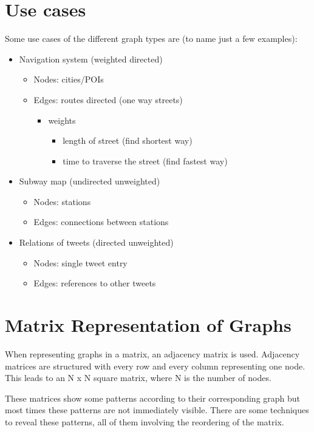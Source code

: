 \section{Use cases}
Some use cases of the different graph types are (to name just a few examples):
\begin{itemize}
\item Navigation system (weighted directed)
	\begin{itemize}
		\item Nodes: cities/POIs
		\item Edges: routes directed (one way streets)
		\begin{itemize}
			\item weights
			\begin{itemize}
				\item length of street (find shortest way)
				\item time to traverse the street (find fastest way)
			\end{itemize}		
		\end{itemize}
	\end{itemize}		
\item Subway map (undirected unweighted)
\begin{itemize}
	\item Nodes: stations
	\item Edges: connections between stations
\end{itemize}
\item Relations of tweets (directed unweighted)
\begin{itemize}
	\item Nodes: single tweet entry
	\item Edges: references to other tweets
\end{itemize}
\end{itemize}


\section{Matrix Representation of Graphs}

When representing graphs in a matrix, an adjacency matrix is used. Adjacency matrices are structured with every row and every column representing one node. This leads to an N x N square matrix, where N is the number of nodes. 

These matrices show some patterns according to their corresponding graph but most times these patterns are not immediately visible. There are some techniques to reveal these patterns, all of them involving the reordering of the matrix.

